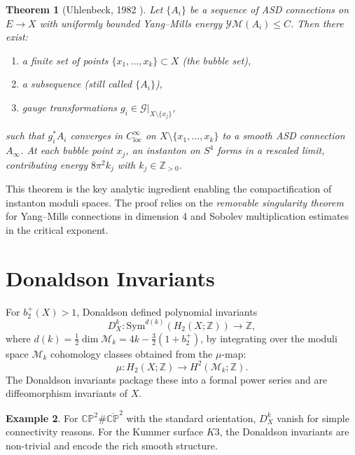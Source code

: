 \documentclass[12pt,a4paper]{amsart}
\newtheorem{theorem}{Theorem}[section]
\theoremstyle{definition}
\newtheorem{example}[theorem]{Example}
\theoremstyle{remark}
\newcommand{\CP}{\mathbb{CP}}
\newcommand{\ZZ}{\mathbb{Z}}
\begin{document}
\begin{theorem}[Uhlenbeck, 1982 \cite{Uhlenbeck1982}]
Let $\{A_i\}$ be a sequence of ASD connections on $E \to X$ with uniformly
bounded Yang--Mills energy $\mathcal{YM}(A_i) \le C$.  Then there exist:
\begin{enumerate}[label=(\roman*)]
  \item a finite set of points $\{x_1,\ldots,x_k\} \subset X$ (the
        \emph{bubble set}),
  \item a subsequence (still called $\{A_i\}$),
  \item gauge transformations $g_i \in \mathcal{G}|_{X \setminus \{x_j\}}$,
\end{enumerate}
such that $g_i^* A_i$ converges in $C^\infty_{\mathrm{loc}}$ on
$X \setminus \{x_1,\ldots,x_k\}$ to a smooth ASD connection $A_\infty$.
At each bubble point $x_j$, an instanton on $S^4$ forms in a rescaled
limit, contributing energy $8\pi^2 k_j$ with $k_j \in \ZZ_{>0}$.
\end{theorem}

This theorem is the key analytic ingredient enabling the compactification of
instanton moduli spaces.  The proof relies on the \emph{removable
singularity theorem} for Yang--Mills connections in dimension 4 and
Sobolev multiplication estimates in the critical exponent.

\section{Donaldson Invariants}

For $b_2^+(X) > 1$, Donaldson defined polynomial invariants
\[
  D_X^k \colon \mathrm{Sym}^{d(k)}(H_2(X;\ZZ)) \longrightarrow \ZZ,
\]
where $d(k) = \tfrac{1}{2}\dim \mathcal{M}_k = 4k - \tfrac{3}{2}(1 + b_2^+)$,
by integrating over the moduli space $\mathcal{M}_k$ cohomology classes
obtained from the $\mu$-map:
\[
  \mu \colon H_2(X;\ZZ) \longrightarrow H^2(\mathcal{M}_k;\ZZ).
\]
The Donaldson invariants package these into a formal power series and are
diffeomorphism invariants of $X$.

\begin{example}
For $\CP^2 \# \overline{\CP}^2$ with the standard orientation, $D_X^k$
vanish for simple connectivity reasons.  For the Kummer surface $K3$, the
Donaldson invariants are non-trivial and encode the rich smooth structure.
\end{example}
\end{document}
